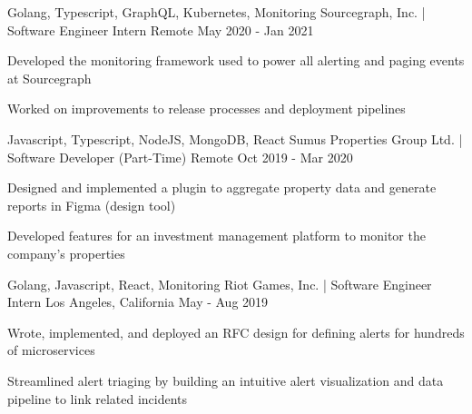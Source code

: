 

\begin{cventries}

  \cventry
    {Golang, Typescript, GraphQL, Kubernetes, Monitoring} %
    {Sourcegraph, Inc. | Software Engineer Intern} %
    {Remote} %
    {May 2020 - Jan 2021} %
    {
      \begin{cvitems} %
        \item {Developed the monitoring framework used to power all alerting and paging events at Sourcegraph}
        \item {Worked on improvements to release processes and deployment pipelines}
      \end{cvitems}
    }

  \cventry
    {Javascript, Typescript, NodeJS, MongoDB, React} %
    {Sumus Properties Group Ltd. | Software Developer (Part-Time)} %
    {Remote} %
    {Oct 2019 - Mar 2020} %
    {
      \begin{cvitems} %
        \item {Designed and implemented a plugin to aggregate property data and generate reports in Figma (design tool)}
        \item {Developed features for an investment management platform to monitor the company's properties}
      \end{cvitems}
    }

  \cventry
    {Golang, Javascript, React, Monitoring} %
    {Riot Games, Inc. | Software Engineer Intern} %
    {Los Angeles, California} %
    {May - Aug 2019} %
    {
      \begin{cvitems} %
        \item {Wrote, implemented, and deployed an RFC design for defining alerts for hundreds of microservices}
        \item {Streamlined alert triaging by building an intuitive alert visualization and data pipeline to link related incidents}
      \end{cvitems}
    }


\end{cventries}
